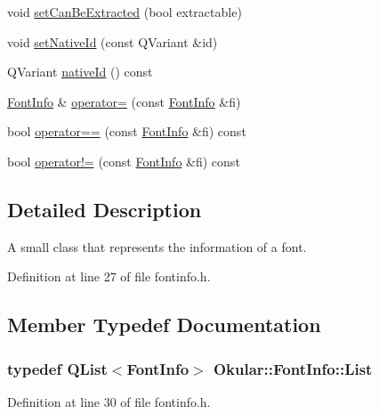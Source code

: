 \begin{DoxyCompactItemize}
\item 
void \hyperlink{classOkular_1_1FontInfo_a4008f39b90867e3d908c7345db2e636d}{set\+Can\+Be\+Extracted} (bool extractable)
\item 
void \hyperlink{classOkular_1_1FontInfo_a7d453c6486badd040d83383f42651c35}{set\+Native\+Id} (const Q\+Variant \&id)
\item 
Q\+Variant \hyperlink{classOkular_1_1FontInfo_aae4d948a8671178cfa880167c1d78a78}{native\+Id} () const 
\item 
\hyperlink{classOkular_1_1FontInfo}{Font\+Info} \& \hyperlink{classOkular_1_1FontInfo_a2fc7db3aef886a68432ebc0adcd256d9}{operator=} (const \hyperlink{classOkular_1_1FontInfo}{Font\+Info} \&fi)
\item 
bool \hyperlink{classOkular_1_1FontInfo_a5b74351cae436727c96cb855e0dd9768}{operator==} (const \hyperlink{classOkular_1_1FontInfo}{Font\+Info} \&fi) const 
\item 
bool \hyperlink{classOkular_1_1FontInfo_a705db148852f70a58cb0196bcc0243f2}{operator!=} (const \hyperlink{classOkular_1_1FontInfo}{Font\+Info} \&fi) const 
\end{DoxyCompactItemize}


\subsection{Detailed Description}
A small class that represents the information of a font. 

Definition at line 27 of file fontinfo.\+h.



\subsection{Member Typedef Documentation}
\hypertarget{classOkular_1_1FontInfo_ada799641ba87703c808645f57fdfafaa}{
\subsubsection[{List}]{\setlength{\rightskip}{0pt plus 5cm}typedef {\bf Q\+List}$<${\bf Font\+Info}$>$ {\bf Okular\+::\+Font\+Info\+::\+List}}}\label{classOkular_1_1FontInfo_ada799641ba87703c808645f57fdfafaa}


Definition at line 30 of file fontinfo.\+h.



